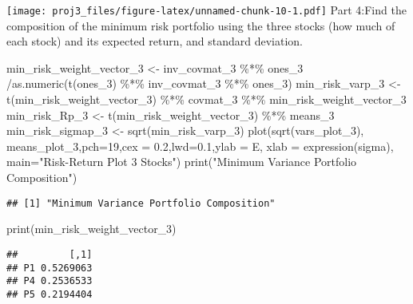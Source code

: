 \documentclass[
]{article}
\newenvironment{Shaded}{\begin{snugshade}}{\end{snugshade}}
\newcommand{\AttributeTok}[1]{\textcolor[rgb]{0.77,0.63,0.00}{#1}}
\newcommand{\DecValTok}[1]{\textcolor[rgb]{0.00,0.00,0.81}{#1}}
\newcommand{\FloatTok}[1]{\textcolor[rgb]{0.00,0.00,0.81}{#1}}
\newcommand{\FunctionTok}[1]{\textcolor[rgb]{0.00,0.00,0.00}{#1}}
\newcommand{\NormalTok}[1]{#1}
\newcommand{\OtherTok}[1]{\textcolor[rgb]{0.56,0.35,0.01}{#1}}
\newcommand{\SpecialCharTok}[1]{\textcolor[rgb]{0.00,0.00,0.00}{#1}}
\newcommand{\StringTok}[1]{\textcolor[rgb]{0.31,0.60,0.02}{#1}}
\begin{document}
\texttt{[image: proj3\_files/figure-latex/unnamed-chunk-10-1.pdf]} Part
4:Find the composition of the minimum risk portfolio using the three
stocks (how much of each stock) and its expected return, and standard
deviation.

\begin{Shaded}
\begin{Highlighting}[]
\NormalTok{min\_risk\_weight\_vector\_3 }\OtherTok{\textless{}{-}}\NormalTok{ inv\_covmat\_3  }\SpecialCharTok{\%*\%}\NormalTok{ ones\_3 }\SpecialCharTok{/}\FunctionTok{as.numeric}\NormalTok{(}\FunctionTok{t}\NormalTok{(ones\_3)  }\SpecialCharTok{\%*\%}\NormalTok{  inv\_covmat\_3 }\SpecialCharTok{\%*\%}\NormalTok{ ones\_3) }
\NormalTok{min\_risk\_varp\_3 }\OtherTok{\textless{}{-}} \FunctionTok{t}\NormalTok{(min\_risk\_weight\_vector\_3) }\SpecialCharTok{\%*\%}\NormalTok{ covmat\_3 }\SpecialCharTok{\%*\%}\NormalTok{ min\_risk\_weight\_vector\_3 }
\NormalTok{min\_risk\_Rp\_3 }\OtherTok{\textless{}{-}} \FunctionTok{t}\NormalTok{(min\_risk\_weight\_vector\_3) }\SpecialCharTok{\%*\%}\NormalTok{ means\_3 }
\NormalTok{min\_risk\_sigmap\_3 }\OtherTok{\textless{}{-}} \FunctionTok{sqrt}\NormalTok{(min\_risk\_varp\_3)}
\FunctionTok{plot}\NormalTok{(}\FunctionTok{sqrt}\NormalTok{(vars\_plot\_3), means\_plot\_3,}\AttributeTok{pch=}\DecValTok{19}\NormalTok{,}\AttributeTok{cex =} \FloatTok{0.2}\NormalTok{,}\AttributeTok{lwd=}\FloatTok{0.1}\NormalTok{,}\AttributeTok{ylab =} \StringTok{\textquotesingle{}E\textquotesingle{}}\NormalTok{, }\AttributeTok{xlab =} \FunctionTok{expression}\NormalTok{(sigma), }\AttributeTok{main=}\StringTok{"Risk{-}Return Plot 3 Stocks"}\NormalTok{)}
\FunctionTok{print}\NormalTok{(}\StringTok{"Minimum Variance Portfolio Composition"}\NormalTok{)}
\end{Highlighting}
\end{Shaded}

\begin{verbatim}
## [1] "Minimum Variance Portfolio Composition"
\end{verbatim}

\begin{Shaded}
\begin{Highlighting}[]
\FunctionTok{print}\NormalTok{(min\_risk\_weight\_vector\_3)}
\end{Highlighting}
\end{Shaded}

\begin{verbatim}
##         [,1]
## P1 0.5269063
## P4 0.2536533
## P5 0.2194404
\end{verbatim}
\end{document}

